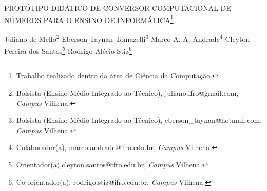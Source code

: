 \documentclass[article,12pt,onesidea,4paper,english,brazil]{abntex2}
\begin{document}
	
	
	\frenchspacing 
	
	\begin{center}
		\LARGE PROTÓTIPO DIDÁTICO DE CONVERSOR COMPUTACIONAL DE NÚMEROS PARA O ENSINO DE INFORMÁTICA\footnote{Trabalho realizado dentro da área de Ciência da Computação.}
		
		\normalsize
		Juliano de Mello\footnote{Bolsista (Ensino Médio Integrado ao Técnico), juliano.ifro@gmail.com, \textit{Campus} Vilhena.} 
		Eberson Taynan Tomazelli\footnote{Bolsista (Ensino Médio Integrado ao Técnico), eberson\_taynan@hotmail.com, \textit{Campus} Vilhena.} 
		Marco A. A. Andrade\footnote{Colaborador(a), marco.andrade@ifro.edu.br, \textit{Campus} Vilhena.} 
		Cleyton Pereira dos Santos\footnote{Orientador(a),cleyton.santos@ifro.edu.br, \textit{Campus} Vilhena.}
		Rodrigo Alécio Stiz\footnote{Co-orientador(a), rodrigo.stiz@ifro.edu.br, \textit{Campus} Vilhena.} 
	\end{center}
	
\end{document}

